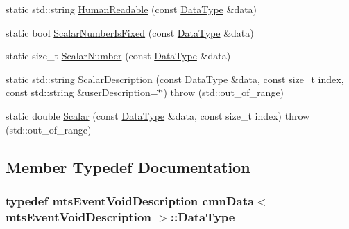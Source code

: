 \begin{DoxyCompactItemize}
\item 
static std\-::string \hyperlink{classcmn_data_3_01mts_event_void_description_01_4_a0cd94a6df68ef8a3aef6a44ea7bbc69d}{Human\-Readable} (const \hyperlink{classcmn_data_3_01mts_event_void_description_01_4_ae99d827ac01b4f0ef589606af2924260}{Data\-Type} \&data)
\item 
static bool \hyperlink{classcmn_data_3_01mts_event_void_description_01_4_ae8e860b80362aa7b63972b1236308f97}{Scalar\-Number\-Is\-Fixed} (const \hyperlink{classcmn_data_3_01mts_event_void_description_01_4_ae99d827ac01b4f0ef589606af2924260}{Data\-Type} \&data)
\item 
static size\-\_\-t \hyperlink{classcmn_data_3_01mts_event_void_description_01_4_aeac049bd2f8c1f8e0c46c3fb3ce61bcd}{Scalar\-Number} (const \hyperlink{classcmn_data_3_01mts_event_void_description_01_4_ae99d827ac01b4f0ef589606af2924260}{Data\-Type} \&data)
\item 
static std\-::string \hyperlink{classcmn_data_3_01mts_event_void_description_01_4_a055496c23878a3ad2268c1ed1bbb713f}{Scalar\-Description} (const \hyperlink{classcmn_data_3_01mts_event_void_description_01_4_ae99d827ac01b4f0ef589606af2924260}{Data\-Type} \&data, const size\-\_\-t index, const std\-::string \&user\-Description=\char`\"{}\char`\"{})  throw (std\-::out\-\_\-of\-\_\-range)
\item 
static double \hyperlink{classcmn_data_3_01mts_event_void_description_01_4_ab08f27128dcb154bd701920a243bb623}{Scalar} (const \hyperlink{classcmn_data_3_01mts_event_void_description_01_4_ae99d827ac01b4f0ef589606af2924260}{Data\-Type} \&data, const size\-\_\-t index)  throw (std\-::out\-\_\-of\-\_\-range)
\end{DoxyCompactItemize}


\subsection{Member Typedef Documentation}
\hypertarget{classcmn_data_3_01mts_event_void_description_01_4_ae99d827ac01b4f0ef589606af2924260}{
\subsubsection[{Data\-Type}]{\setlength{\rightskip}{0pt plus 5cm}typedef {\bf mts\-Event\-Void\-Description} {\bf cmn\-Data}$<$ {\bf mts\-Event\-Void\-Description} $>$\-::{\bf Data\-Type}}}\label{classcmn_data_3_01mts_event_void_description_01_4_ae99d827ac01b4f0ef589606af2924260}


